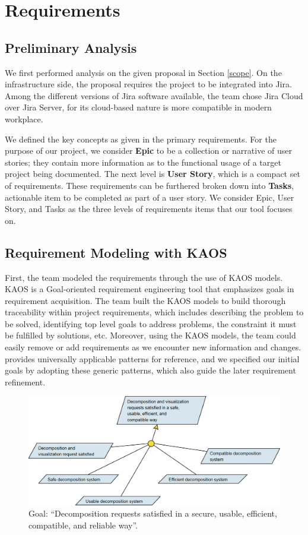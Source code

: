 \section{Requirements}
\label{requirement}

\subsection{Preliminary Analysis}
We first performed analysis on the given proposal in Section \ref{scope}. On the infrastructure side, the proposal requires the project to be integrated into Jira. Among the different versions of Jira software available, the team chose Jira Cloud over Jira Server, for its cloud-based nature is more compatible in modern workplace. 

We defined the key concepts as given in the primary requirements. For the purpose of our project, we consider
\textbf{Epic} to be a collection or narrative of user stories; they contain more information as to the functional usage of a target project being documented. The next level is \textbf{User Story}, which is a compact set of requirements. These requirements can be furthered broken down into \textbf{Tasks}, actionable item to be completed as part of a user story. 
We consider Epic, User Story, and Tasks as the three levels of requirements items that our tool focuses on. 

\subsection{Requirement Modeling with KAOS}
First, the team modeled the requirements through the use of KAOS models\cite{KAOS}. KAOS is a Goal-oriented requirement engineering \cite{GOAL} tool that emphasizes goals in requirement acquisition. The team built the KAOS models to build thorough traceability within project requirements, which includes describing the problem to be solved, identifying top level goals to address problems, the constraint it must be fulfilled by solutions, etc. Moreover, using the KAOS models, the team could easily remove or add requirements as we encounter new information and changes. \cite{KAOS} provides universally applicable patterns for reference, and we specified our initial goals by adopting these generic patterns, which also guide the later requirement refinement.

\begin{figure}
\centering
\includegraphics[width=\textwidth,keepaspectratio]{./figure/GoalsNFR1.png}
\caption{Goal: “Decomposition requests satisfied in a secure, usable, efficient, compatible, and reliable way”.}
\label{goal1}
\end{figure}

